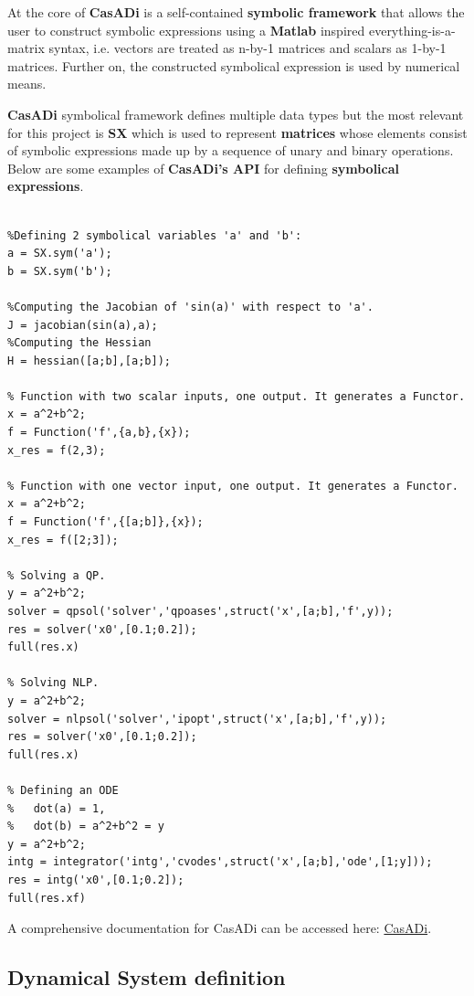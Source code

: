 \documentclass[12pt, letterpaper]{article}
\begin{document}
At the core of \textbf{CasADi} is a self-contained \textbf{symbolic framework} that allows the user to construct symbolic expressions using a \textbf{Matlab} inspired everything-is-a-matrix syntax, i.e. vectors are treated as n-by-1 matrices and scalars as 1-by-1 matrices. Further on, the constructed symbolical expression is used by numerical means.

\textbf{CasADi} symbolical framework defines multiple data types but the most relevant for this project is \textbf{SX} which is used to represent \textbf{matrices} whose elements consist of symbolic expressions made up by a sequence of unary and binary operations.
Below are some examples of \textbf{CasADi's  API} for defining \textbf{symbolical expressions}.

\begin{lstlisting}

%Defining 2 symbolical variables 'a' and 'b':
a = SX.sym('a');
b = SX.sym('b');

%Computing the Jacobian of 'sin(a)' with respect to 'a'.
J = jacobian(sin(a),a);
%Computing the Hessian
H = hessian([a;b],[a;b]);

% Function with two scalar inputs, one output. It generates a Functor.
x = a^2+b^2;
f = Function('f',{a,b},{x});
x_res = f(2,3);

% Function with one vector input, one output. It generates a Functor.
x = a^2+b^2;
f = Function('f',{[a;b]},{x});
x_res = f([2;3]);

% Solving a QP.
y = a^2+b^2;
solver = qpsol('solver','qpoases',struct('x',[a;b],'f',y));
res = solver('x0',[0.1;0.2]);
full(res.x)

% Solving NLP.
y = a^2+b^2;
solver = nlpsol('solver','ipopt',struct('x',[a;b],'f',y));
res = solver('x0',[0.1;0.2]);
full(res.x)

% Defining an ODE
%   dot(a) = 1,
%   dot(b) = a^2+b^2 = y 
y = a^2+b^2;
intg = integrator('intg','cvodes',struct('x',[a;b],'ode',[1;y]));
res = intg('x0',[0.1;0.2]);
full(res.xf)

\end{lstlisting}

A comprehensive documentation for CasADi can be accessed here: \href{https://web.casadi.org/docs/}{CasADi}.


\subsection{Dynamical System definition}
\label{label_DynamicalSystemDefinition}
\end{document}
